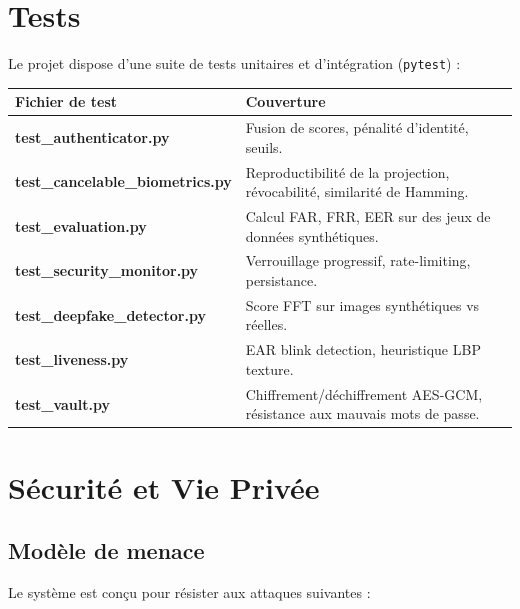 \documentclass[12pt,a4paper]{article}
\begin{document}
\section{Tests}

Le projet dispose d'une suite de tests unitaires et d'intégration (\texttt{pytest}) :

\begin{longtable}{>{\bfseries}p{5cm} p{9cm}}
\toprule
Fichier de test & Couverture \\
\midrule
\endhead
\bottomrule
\endfoot
test\_authenticator.py & Fusion de scores, pénalité d'identité, seuils. \\[3pt]
test\_cancelable\_biometrics.py & Reproductibilité de la projection, révocabilité,
                                   similarité de Hamming. \\[3pt]
test\_evaluation.py & Calcul FAR, FRR, EER sur des jeux de données synthétiques. \\[3pt]
test\_security\_monitor.py & Verrouillage progressif, rate-limiting, persistance. \\[3pt]
test\_deepfake\_detector.py & Score FFT sur images synthétiques vs réelles. \\[3pt]
test\_liveness.py & EAR blink detection, heuristique LBP texture. \\[3pt]
test\_vault.py & Chiffrement/déchiffrement AES-GCM, résistance aux mauvais
                 mots de passe. \\
\end{longtable}

\section{Sécurité et Vie Privée}

\subsection{Modèle de menace}

Le système est conçu pour résister aux attaques suivantes :
\end{document}
